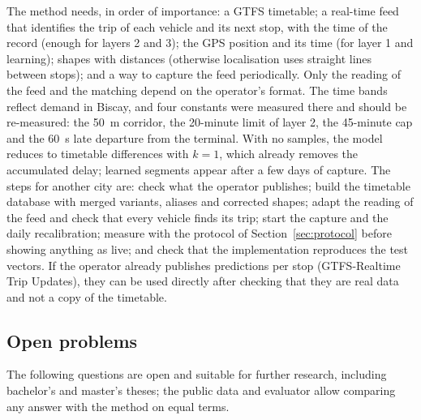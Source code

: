 The method needs, in order of importance: a GTFS timetable; a real-time feed that identifies the trip of each vehicle
and its next stop, with the time of the record (enough for layers 2 and 3); the GPS position and its time (for layer 1
and learning); shapes with distances (otherwise localisation uses straight lines between stops); and a way to capture
the feed periodically. Only the reading of the feed and the matching depend on the operator's format. The time bands
reflect demand in Biscay, and four constants were measured there and should be re-measured: the 50~m corridor, the
20-minute limit of layer 2, the 45-minute cap and the 60~s late departure from the terminal. With no samples, the model
reduces to timetable differences with $k=1$, which already removes the accumulated delay; learned segments appear after
a few days of capture. The steps for another city are: check what the operator publishes; build the timetable database
with merged variants, aliases and corrected shapes; adapt the reading of the feed and check that every vehicle finds
its trip; start the capture and the daily recalibration; measure with the protocol of Section~\ref{sec:protocol} before
showing anything as live; and check that the implementation reproduces the test vectors. If the operator already
publishes predictions per stop (GTFS-Realtime Trip Updates), they can be used directly after checking that they are
real data and not a copy of the timetable.

\subsection{Open problems}
\label{sec:open}

The following questions are open and suitable for further research, including bachelor's and master's theses; the
public data and evaluator allow comparing any answer with the method on equal terms.

